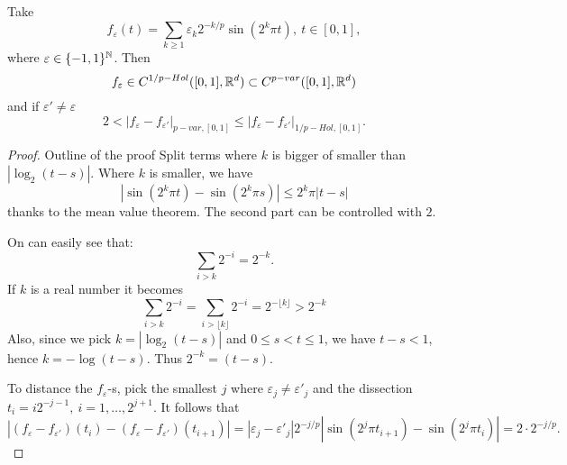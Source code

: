 \begin{example}
    Take
    \begin{equation}
        f_\varepsilon(t) = \sum_{k \ge 1} \varepsilon_k 2^{- k / p} \sin(2^k \pi t),\ t \in [0,1],
    \end{equation}
    where $\varepsilon \in \{-1, 1\}^{\mathbb{N}}$.
    Then
    \begin{equation}
        f_\varepsilon \in C^{1/p-Hol}([0,1],\mathbb{R}^d) \subset C^{p-var}([0,1],\mathbb{R}^d)
    \end{equation}
    and if $\varepsilon' \neq \varepsilon$
    \begin{equation}
        2 < |f_\varepsilon - f_{\varepsilon'}|_{p-var,[0,1]} \le |f_\varepsilon - f_{\varepsilon'}|_{1/p-Hol,[0,1]}.
    \end{equation}
\end{example}
\begin{proof}{Outline of the proof}
    Split terms where $k$ is bigger of smaller than $|\log_2(t-s)|$.
    Where $k$ is smaller, we have
    \begin{equation}
        |\sin(2^k \pi t) - \sin(2^k \pi s)| \le 2^k \pi |t - s|
    \end{equation}
    thanks to the mean value theorem.
    The second part can be controlled with $2$.
    
    On can easily see that:
    \begin{equation}
        \sum_{i > k} 2^{-i} = 2^{-k}.
    \end{equation}
    If $k$ is a real number it becomes 
    \begin{equation}
        \sum_{i > k} 2^{-i} = \sum_{i > \lfloor k \rfloor} 2^{-i} = 2^{-\lfloor k \rfloor} > 2^{-k}
    \end{equation}
    Also, since we pick $k = |\log_2(t-s)|$ and $0 \le s < t \le 1$, we have $t - s < 1$, hence $k = - \log(t - s)$.
    Thus $2^{-k} = (t - s).$

    To distance the $f_\varepsilon$-s, pick the smallest $j$ where $\varepsilon_j \ne \varepsilon'_j$ and the dissection $t_i = i2^{-j-1},\ i = 1,\ldots,2^{j+1}.$
    It follows that 
    \begin{equation}
        |(f_\varepsilon - f_{\varepsilon'})(t_i) - (f_\varepsilon - f_{\varepsilon'})(t_{i+1})| = 
        |\varepsilon_j - \varepsilon'_j| 2^{-j/p} |\sin(2^j \pi t_{i+1}) - \sin(2^j \pi t_i)| =
        2 \cdot 2^{-j/p}.
    \end{equation}
\end{proof}

